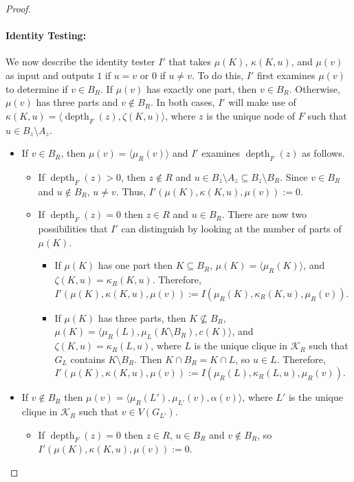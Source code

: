 \documentclass{patmorin}
\DeclareMathOperator{\depth}{depth}
\newcommand{\calK}{\mathcal{K}}
\begin{document}
\begin{proof}
  \paragraph{Identity Testing:}
  We now describe the identity tester $I'$ that takes $\mu(K)$, $\kappa(K,u)$, and $\mu(v)$ as input and outputs $1$ if $u=v$ or $0$ if $u\neq v$.  To do this, $I'$ first examines $\mu(v)$ to determine if $v\in B_R$.  If $\mu(v)$ has exactly one part, then $v\in B_R$. Otherwise, $\mu(v)$ has three parts and $v\not\in B_R$.
  In both cases, $I'$ will make use of $\kappa(K,u)=\langle\depth_F(z),\zeta(K,u)\rangle$, where $z$ is the unique node of $F$ such that $u\in B_z\setminus A_z$.
  \begin{itemize}
    \item If $v\in B_R$, then $\mu(v)=\langle\mu_R(v)\rangle$ and $I'$ examines  $\depth_F(z)$ as follows.
    \begin{itemize}
      \item If $\depth_F(z)> 0$, then $z\not\in R$ and $u\in B_z\setminus A_z\subseteq B_z\setminus B_R$.  Since $v\in B_R$ and $u\not\in B_R$, $u\neq v$.  Thus, $I'(\mu(K),\kappa(K,u),\mu(v)):=0$.

      \item If $\depth_F(z)=0$ then $z\in R$ and $u\in B_R$.   There are now two possibilities that $I'$ can distinguish by looking at the number of parts of $\mu(K)$.
      \begin{itemize}
        \item If $\mu(K)$ has one part then $K\subseteq B_R$,  $\mu(K)=\langle \mu_R(K)\rangle$, and $\zeta(K,u)=\kappa_R(K,u)$.  Therefore, $I'(\mu(K),\kappa(K,u),\mu(v)):=I(\mu_R(K),\kappa_R(K,u),\mu_R(v))$.
        \item If $\mu(K)$ has three parts, then $K\not\subseteq B_R$, $\mu(K)=\langle \mu_R(L),\mu_L(K\setminus B_R),c(K)\rangle$, and  $\zeta(K,u)=\kappa_R(L,u)$, where $L$ is the unique clique in $\calK_R$ such that $G_L$ contains $K\setminus B_R$.  Then $K\cap B_R=K\cap L$, so $u\in L$. Therefore, $I'(\mu(K),\kappa(K,u),\mu(v)):=I(\mu_R(L),\kappa_R(L,u),\mu_R(v))$.
      \end{itemize}
    \end{itemize}
    \item If $v\not\in B_R$ then $\mu(v)=\langle \mu_R(L'),\mu_{L'}(v),\alpha(v)\rangle$, where $L'$ is the unique clique in $\calK_R$ such that $v\in V(G_{L'})$.
    \begin{itemize}
      \item If $\depth_F(z)=0$ then $z\in R$, $u\in B_R$ and $v\not\in B_R$, so $I'(\mu(K),\kappa(K,u),\mu(v)):=0$.


\end{itemize}
\end{itemize}
\end{proof}
\end{document}
